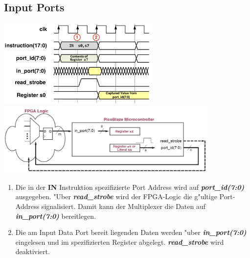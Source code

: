 \subsection{Input Ports}
\includegraphics[width=8cm]{pics/7-Input-Ports_Timing}
\includegraphics[width=11cm]{pics/7-Input-Ports_Logik}
\begin{enumerate}
	\color{red}
	\renewcommand{\labelenumi}{\circled{\oldlabelenumi}}
		\item \color{black} Die in der \color{red} \textbf{IN} \color{black} Instruktion spezifizierte Port Address wird auf \textit{\textbf{port\_id(7:0)}} ausgegeben. "Uber \textit{\textbf{read\_strobe}} wird der FPGA-Logic die g"ultige Port-Address signalisiert. Damit kann der Multiplexer die Daten auf \textit{\textbf{in\_port(7:0)}} bereitlegen.
	\renewcommand{\labelenumi}{\oldlabelenumi}
	\color{red}
	\renewcommand{\labelenumi}{\circled{\oldlabelenumi}}
		\item \color{black} Die am Input Data Port bereit liegenden Daten werden "uber \textit{\textbf{in\_port(7:0)}} eingelesen und im spezifizierten Register abgelegt. \textit{\textbf{read\_strobe}} wird deaktiviert.
	\renewcommand{\labelenumi}{\oldlabelenumi}
\end{enumerate}
\newpage

